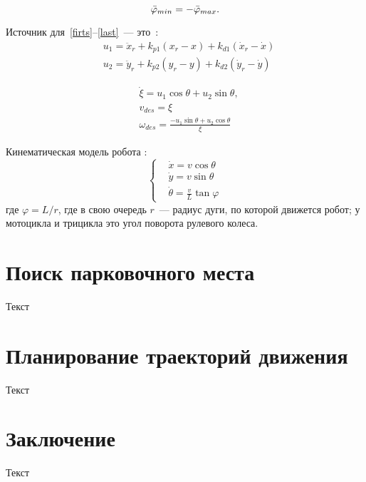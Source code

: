 \begin{equation}
    \bar{\varphi}_{min} = -\bar{\varphi}_{max}\ldotp
\end{equation}

Источник для~\eqref{firts}--\eqref{last}~--- это~\cite{de_luca}:
\begin{align}
    & u_1 = \ddot{x}_r + k_{p1} (x_r - x) + k_{d1} (\dot{x}_r - \dot{x}) \label{firts}\\
    & u_2 = \ddot{y}_r + k_{p2} (y_r - y) + k_{d2} (\dot{y}_r - \dot{y})
\end{align}

\begin{align}
& \dot{\xi} = u_1 \cos \theta + u_2 \sin \theta, \\
& v_{des} = \xi \\
& \omega_{des} = \frac{-u_1 \sin \theta + u_2 \cos \theta}{\xi} \label{last}
\end{align}

Кинематическая модель робота \cite{de_luca, survey}:
\begin{equation}
    \left\{
    \begin{aligned}
        & \dot{x} = v \cos \theta \\
        & \dot{y} = v \sin \theta \\
        & \dot{\theta} = \frac{v}{L} \tan{\varphi}
    \end{aligned}
    \right.
\end{equation}
где $\varphi = L / r$, где в свою очередь $r$~--- радиус дуги, по которой движется робот; у мотоцикла и трицикла это угол поворота рулевого колеса.

\newpage
\section{Поиск парковочного места}
Текст


\newpage
\section{Планирование траекторий движения}
Текст


\newpage
\section*{Заключение}
Текст